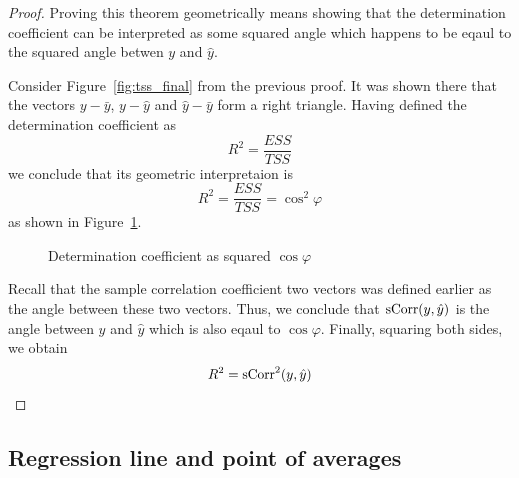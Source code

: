 \begin{proof}
Proving this theorem geometrically means showing that the determination coefficient can be interpreted as some squared angle
which happens to be eqaul to the squared angle betwen $y$ and $\hat y$.

Consider Figure~\ref{fig:tss_final} from the previous proof.
It was shown there that the vectors $y - \bar y$, $y - \hat y$ and $\hat y - \bar y$ form a right triangle.
Having defined the determination coefficient as
\[
R^2 = \frac{ESS}{TSS}
\]
we conclude that its geometric interpretaion is
\[
R^2 = \frac{ESS}{TSS} = \cos^2 \varphi
\]
as shown in Figure~\ref{fig:r_sq_angle}.

\begin{figure}
  \caption{Determination coefficient as squared $\cos \varphi$}
  \label{fig:r_sq_angle}
\end{figure}

Recall that the sample correlation coefficient two vectors was defined earlier as the angle between these two vectors.
Thus, we conclude that $\operatorname{sCorr}(y, \hat y)$ is the angle between $y$ and $\hat y$ which is also eqaul to $\cos \varphi$.
Finally, squaring both sides, we obtain
\[
R^2 = \operatorname{sCorr}^2(y, \hat y)
\]
\end{proof}


\subsection{Regression line and point of averages}

